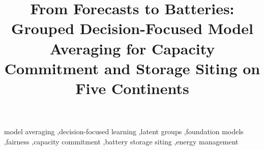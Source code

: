 \documentclass[preprint,12pt,authoryear]{elsarticle}
\begin{document}
\begin{frontmatter}

\title{From Forecasts to Batteries: Grouped Decision-Focused Model Averaging for Capacity Commitment and Storage Siting on Five Continents}



\begin{keyword}
model averaging \sep decision-focused learning \sep latent groups \sep foundation models \sep fairness \sep capacity commitment \sep battery storage siting \sep energy management
\end{keyword}

\end{frontmatter}















\appendix

\end{document}
